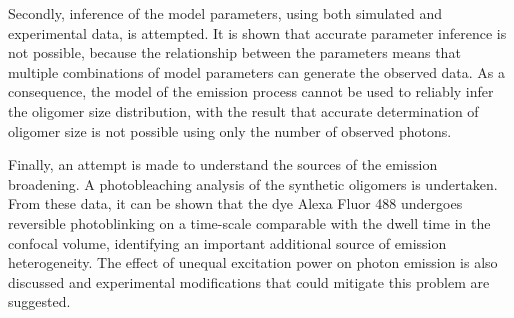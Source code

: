 Secondly, inference of the model parameters, using both simulated and experimental data, is attempted. It is shown that accurate parameter inference is not possible, because the relationship between the parameters means that multiple combinations of model parameters can generate the observed data. As a consequence, the model of the emission process cannot be used to reliably infer the oligomer size distribution, with the result that accurate determination of oligomer size is not possible using only the number of observed photons.

Finally, an attempt is made to understand the sources of the emission broadening. A photobleaching analysis of the synthetic oligomers is undertaken. From these data, it can be shown that the dye Alexa Fluor 488 undergoes reversible photoblinking on a time-scale comparable with the dwell time in the confocal volume, identifying an important additional source of emission heterogeneity. The effect of unequal excitation power on photon emission is also discussed and experimental modifications that could mitigate this problem are suggested. 

%




